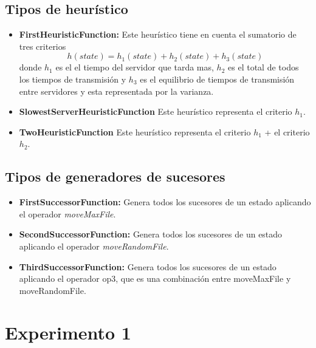 \documentclass[a4paper,10pt]{report}
\begin{document}
        \subsection*{Tipos de heurístico}
            \begin{itemize}
                \item \textbf{FirstHeuristicFunction:} Este heurístico tiene en cuenta el sumatorio de tres criterios 
                    \begin{equation}
                        h(state) = h_1(state) + h_2(state) + h_3(state) 
                    \end{equation}
                    donde $h_1$ es el el tiempo del servidor que tarda mas, $h_2$ es el total de todos los tiempos de transmisión 
                    y $h_3$ es el equilibrio de tiempos de transmisión entre servidores y esta representada por la varianza. 
                \item \textbf{SlowestServerHeuristicFunction} Este heurístico representa el criterio $h_1$.
                \item \textbf{TwoHeuristicFunction} Este heurístico representa 
                el criterio $h_1$ + el criterio $h_2$.
            \end{itemize}
        
        \subsection*{Tipos de generadores de sucesores}
            \begin{itemize}
                \item \textbf{FirstSuccessorFunction:} Genera todos los sucesores de un estado aplicando el operador \textit{moveMaxFile}.
                \item \textbf{SecondSuccessorFunction:} Genera todos los sucesores de un estado aplicando el operador \textit{moveRandomFile}.
                \item \textbf{ThirdSuccessorFunction:} Genera todos los sucesores de un estado aplicando el operador {op3}, que es una combinación entre {moveMaxFile} y {moveRandomFile}.
            \end{itemize}
        
        
        
    \newpage
	\section*{Experimento 1}
	
\end{document}
